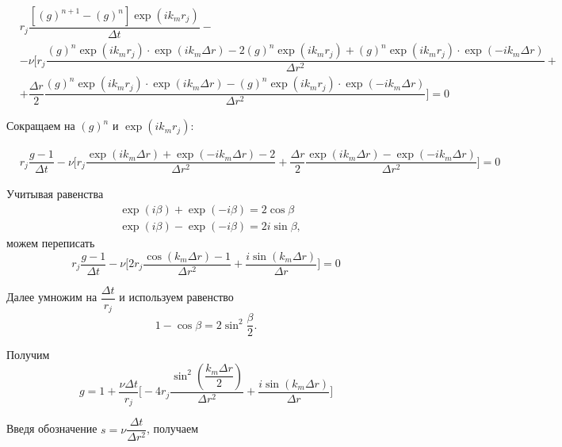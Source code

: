\begin{equation} \label{derivation_g_ftcs}
\begin{split}
	&r_j \dfrac{\left[ (g)^{n+1} - (g)^n \right] \exp (ik_mr_j)}{\Delta t} - \\ 
	& -\nu 
	\biggl[ r_j 
	\dfrac{(g)^n\exp (ik_mr_j) \cdot \exp(ik_m\Delta r) - 2(g)^n\exp (ik_mr_j) + (g)^n \exp (i k_m r_j) \cdot \exp(-ik_m\Delta r)}{\Delta r^2} + \\
	& + \dfrac{\Delta r}{2} \dfrac{(g)^n \exp (ik_m r_j) \cdot \exp (i k_m \Delta r) - (g)^n \exp (i k_m r_j) \cdot \exp (-ik_m\Delta r) }{\Delta r^2} \biggl] = 0
\end{split}
\end{equation}

Сокращаем на $(g)^n$ и $\exp(ik_mr_j)$:

\begin{equation} \label{derivation_g_ftcs_2}
\begin{split}
	& r_j \dfrac{g - 1}{\Delta t} - \nu \biggl[ r_j \dfrac{\exp (ik_m\Delta r) + \exp (-ik_m \Delta r) - 2}{\Delta r^2} + \dfrac{\Delta r}{2} \dfrac{\exp (ik_m\Delta r) - \exp (-ik_m \Delta r)}{\Delta r^2}\biggr] = 0
\end{split}
\end{equation}

Учитывая равенства
\begin{align}
	&\exp (i\beta) + \exp (-i\beta) = 2\cos \beta \\
	&\exp (i\beta) - \exp (-i\beta) = 2 i \sin \beta,
\end{align}
можем переписать
\begin{equation}
	r_j \dfrac{g-1}{\Delta t} - \nu \biggl[ 2r_j \dfrac{\cos (k_m\Delta r) - 1}{\Delta r^2} + \dfrac{i \sin (k_m \Delta r)}{\Delta r} \biggr] = 0
\end{equation}

Далее умножим на $\dfrac{\Delta t}{r_j}$ и используем равенство
\begin{equation}
	1 - \cos \beta = 2 \sin^2 \dfrac{\beta}{2}.
\end{equation}

Получим
\begin{equation}
	g = 1 + \dfrac{\nu \Delta t}{r_j} \biggl[ - 4r_j \dfrac{\sin^2 \left( \dfrac{k_m \Delta r}{2}\right)}{\Delta r^2} + \dfrac{i \sin (k_m \Delta r)}{\Delta r} \biggr]
\end{equation}

Введя обозначение $s = \nu \dfrac{\Delta t}{\Delta r^2}$, получаем

